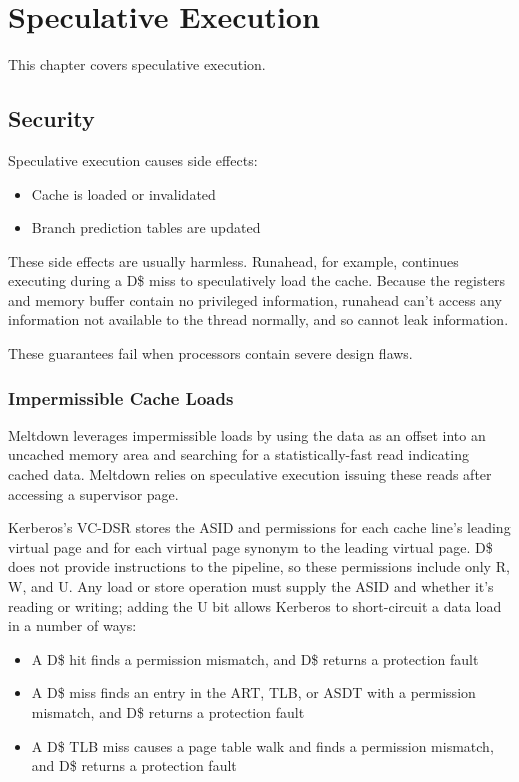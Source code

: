 \chapter{Speculative Execution}

This chapter covers speculative execution.

\section{Security}

Speculative execution causes side effects:

\begin{itemize}

    \item Cache is loaded or invalidated

    \item Branch prediction tables are updated

\end{itemize}

These side effects are usually harmless.  Runahead, for example, continues
executing during a D\$ miss to speculatively load the cache.  Because the
registers and memory buffer contain no privileged information, runahead can't
access any information not available to the thread normally, and so cannot leak
information.

These guarantees fail when processors contain severe design flaws.

\subsection{Impermissible Cache Loads}

Meltdown leverages impermissible loads by using the data as an offset into an
uncached memory area and searching for a statistically-fast read indicating
cached data.  Meltdown relies on speculative execution issuing these reads
after accessing a supervisor page.

Kerberos's VC-DSR stores the ASID and permissions for each cache line's leading
virtual page and for each virtual page synonym to the leading virtual page.
D\$ does not provide instructions to the pipeline, so these permissions include
only R, W, and U.  Any load or store operation must supply the ASID and whether
it's reading or writing; adding the U bit allows Kerberos to short-circuit a
data load in a number of ways:

\begin{itemize}

    \item A D\$ hit finds a permission mismatch, and D\$ returns a protection
        fault

    \item A D\$ miss finds an entry in the ART, TLB, or ASDT with a permission
        mismatch, and D\$ returns a protection fault

    \item A D\$ TLB miss causes a page table walk and finds a permission
        mismatch, and D\$ returns a protection fault

\end{itemize}

